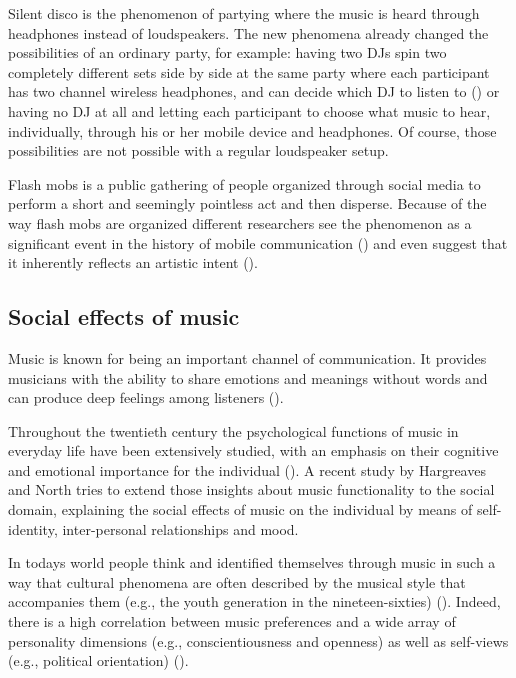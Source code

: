 \documentclass[a4paper,11pt]{article}
\begin{document}
Silent disco is the phenomenon of partying where the music is heard through headphones instead of loudspeakers.
The new phenomena already changed the possibilities of an ordinary party, for example: having two DJs spin two completely different sets side by side at the same party where each participant has two channel wireless headphones, and can decide which DJ to listen to (\citeauthor{web:headphonedisco}) or having no DJ at all and letting each participant to choose what music to hear, individually, through his or her mobile device and headphones.
Of course, those possibilities are not possible with a regular loudspeaker setup.

Flash mobs is a public gathering of people organized through social media to perform a short and seemingly pointless act and then disperse.
Because of the way flash mobs are organized different researchers see the phenomenon as a significant event in the history of mobile communication (\cite{nicholson05}) and even suggest that it inherently reflects an artistic intent (\cite{brejzek10}).

\subsection{Social effects of music}

Music is known for being an important channel of communication.
It provides musicians with the ability to share emotions and meanings without words and can produce deep feelings among listeners (\cite{hargreaves02}).

Throughout the twentieth century the psychological functions of music in everyday life have been extensively studied, with an emphasis on their cognitive and emotional importance for the individual (\cite{hargreaves99}).
A recent study by Hargreaves and North tries to extend those insights about music functionality to the social domain, explaining the social effects of music on the individual by means of self-identity, inter-personal relationships and mood.

In todays world people think and identified themselves through music in such a way that cultural phenomena are often described by the musical style that accompanies them (e.g., the youth generation in the nineteen-sixties) (\cite{cook00}).
Indeed, there is a high correlation between music preferences and a wide array of personality dimensions (e.g., conscientiousness and openness) as well as self-views (e.g., political orientation) (\cite{rentfrow03}).
\end{document}
